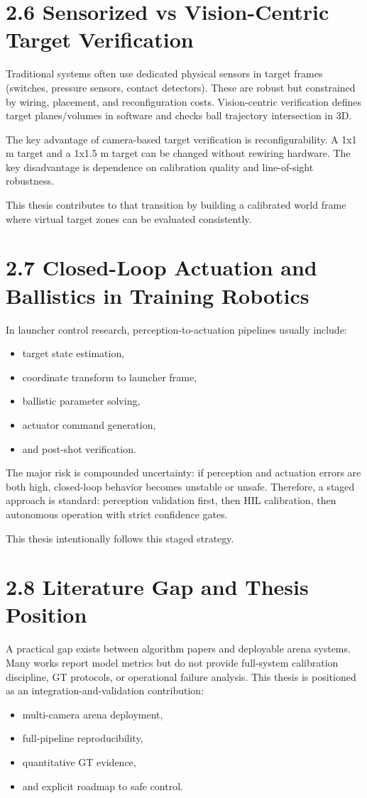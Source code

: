\section{2.6 Sensorized vs Vision-Centric Target Verification}
Traditional systems often use dedicated physical sensors in target frames (switches, pressure sensors, contact detectors). These are robust but constrained by wiring, placement, and reconfiguration costs. Vision-centric verification defines target planes/volumes in software and checks ball trajectory intersection in 3D.

The key advantage of camera-based target verification is reconfigurability. A 1x1 m target and a 1x1.5 m target can be changed without rewiring hardware. The key disadvantage is dependence on calibration quality and line-of-sight robustness.

This thesis contributes to that transition by building a calibrated world frame where virtual target zones can be evaluated consistently.

\section{2.7 Closed-Loop Actuation and Ballistics in Training Robotics}
In launcher control research, perception-to-actuation pipelines usually include:
\begin{itemize}
  \item target state estimation,
  \item coordinate transform to launcher frame,
  \item ballistic parameter solving,
  \item actuator command generation,
  \item and post-shot verification.
\end{itemize}

The major risk is compounded uncertainty: if perception and actuation errors are both high, closed-loop behavior becomes unstable or unsafe. Therefore, a staged approach is standard: perception validation first, then HIL calibration, then autonomous operation with strict confidence gates.

This thesis intentionally follows this staged strategy.

\section{2.8 Literature Gap and Thesis Position}
A practical gap exists between algorithm papers and deployable arena systems. Many works report model metrics but do not provide full-system calibration discipline, GT protocols, or operational failure analysis. This thesis is positioned as an integration-and-validation contribution:
\begin{itemize}
  \item multi-camera arena deployment,
  \item full-pipeline reproducibility,
  \item quantitative GT evidence,
  \item and explicit roadmap to safe control.
\end{itemize}

